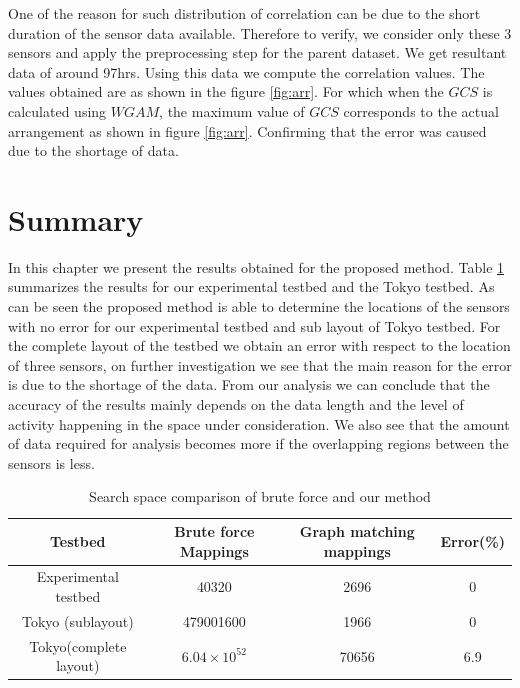 One of the reason for such distribution of correlation can be due to the short duration of the sensor data available. Therefore to verify, we consider only these 3 sensors and apply the preprocessing step for the parent dataset. We get resultant data of around 97hrs. Using this data we compute the correlation values. The values obtained are as shown in the figure \ref{fig:arr}. For which when the $GCS$ is calculated using $WGAM$, the maximum value of $GCS$ corresponds to the actual arrangement as shown in figure \ref{fig:arr}. Confirming that the error was caused due to the shortage of data.


\section{Summary}

In this chapter we present the results obtained for the proposed method. Table \ref{tab:resSummary} summarizes the results for our experimental testbed and the Tokyo testbed. As can be seen the proposed method is able to determine the locations of the sensors with no error for our experimental testbed and sub layout of Tokyo testbed. For the complete layout of the testbed we obtain an error with respect to the location of three sensors, on further investigation we see that the main reason for the error is due to the shortage of the data. From our analysis we can conclude that the accuracy of the results mainly depends on the data length and the level of activity happening in the space under consideration. We also see that the amount of data required for analysis becomes more if the overlapping regions between the sensors is less.

\begin{table}[]
\centering
\caption{Search space comparison of brute force and our method}
\label{tab:resSummary}
\begin{tabular}{|c|c|c|c|}
\hline
Testbed                & Brute force Mappings  & Graph matching mappings & Error(\%) \\ \hline
Experimental testbed                  & 40320                 & 2696                    & 0         \\ \hline
Tokyo (sublayout)      & 479001600             & 1966                     & 0         \\ \hline
Tokyo(complete layout) & $6.04 \times 10^{52}$ & 70656                  & 6.9       \\ \hline
\end{tabular}
\end{table}


















